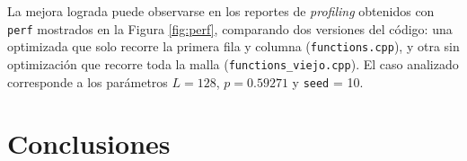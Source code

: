 \documentclass[%
 reprint,
 amsmath,amssymb,
 aps,
]{revtex4-2}
\begin{document}
La mejora lograda puede observarse en los reportes de \textit{profiling} obtenidos con \texttt{perf} mostrados en la Figura \ref{fig:perf}, comparando dos versiones del código: una optimizada que solo recorre la primera fila y columna (\texttt{functions.cpp}), y otra sin optimización que recorre toda la malla (\texttt{functions\_viejo.cpp}). El caso analizado corresponde a los parámetros \( L = 128 \), \( p = 0.59271 \) y \texttt{seed} = 10.


\section{Conclusiones}


\end{document}
